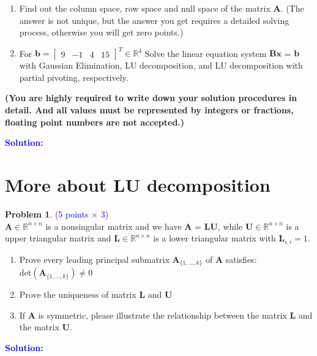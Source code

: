 \documentclass[english,onecolumn]{IEEEtran}
\begin{document}
\begin{enumerate}
  \item Find out the column space, row space and null space of the matrix $ \mathbf{A}$. (The answer is not unique, but the answer you get requires a detailed solving process, otherwise you will get zero points.)
  \item For $\mathbf{b} = \begin{bmatrix}
 9 & -1 & 4 & 15 \end{bmatrix}^T \in \mathbb{R}^{4} $ Solve the linear equation system $\mathbf{Bx}$ = $\mathbf{b}$ with Gaussian Elimination, LU decomposition, and LU decomposition with partial pivoting, respectively. 
\end{enumerate}
\textbf{(You are highly required to write down your solution procedures in detail. And all values must be represented by integers or fractions, floating point numbers are not accepted.)}

\noindent\textcolor{blue}{
	\textbf{Solution:}
	}

\newpage

\section{More about LU decomposition}

\noindent\textbf{Problem 1}. \textcolor{blue}{(5 points $\times$ 3)}
\\
 $\mathbf{A} \in \mathbb{R}^{n \times n}$ is a nonsingular matrix and we have $\mathbf{A}$ = $\mathbf{L}\mathbf{U}$, while $\mathbf{U} \in \mathbb{R}^{n \times n}$ is a upper triangular matrix and $\mathbf{L} \in \mathbb{R}^{n \times n}$ is a lower triangular matrix with $\mathbf{L}_{i,i}=1$.

\begin{enumerate}
    \item  Prove every leading principal submatrix $\mathbf{A}_{\{1, \dots, k \}}$ of $\mathbf{A}$ satisfies:\\
    det$(\mathbf{A}_{\{1, \dots, k \}}) \neq 0 $
    \item Prove the uniqueness of matrix $\mathbf{L}$ and $\mathbf{U}$
    \item If $\mathbf{A}$ is symmetric, please illustrate the relationship between the matrix $\mathbf{L}$ and the matrix $\mathbf{U}$.
\end{enumerate}

\noindent\textcolor{blue}{
	\textbf{Solution:}
	}


\newpage
\end{document}
